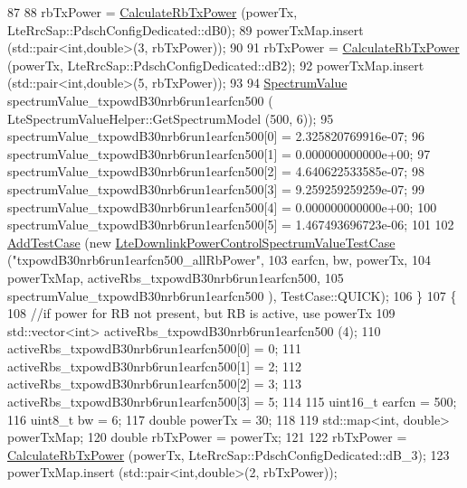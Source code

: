 \begin{DoxyCode}
87 
88     rbTxPower = \hyperlink{classLteDownlinkPowerControlTestSuite_acbda226a1db61d5328141d80aca96447}{CalculateRbTxPower} (powerTx, LteRrcSap::PdschConfigDedicated::dB0);
89     powerTxMap.insert (std::pair<int,double>(3, rbTxPower));
90 
91     rbTxPower = \hyperlink{classLteDownlinkPowerControlTestSuite_acbda226a1db61d5328141d80aca96447}{CalculateRbTxPower} (powerTx, LteRrcSap::PdschConfigDedicated::dB2);
92     powerTxMap.insert (std::pair<int,double>(5, rbTxPower));
93 
94     \hyperlink{classns3_1_1SpectrumValue}{SpectrumValue} spectrumValue\_txpowdB30nrb6run1earfcn500 (
      LteSpectrumValueHelper::GetSpectrumModel (500, 6));
95     spectrumValue\_txpowdB30nrb6run1earfcn500[0] = 2.325820769916e-07;
96     spectrumValue\_txpowdB30nrb6run1earfcn500[1] = 0.000000000000e+00;
97     spectrumValue\_txpowdB30nrb6run1earfcn500[2] = 4.640622533585e-07;
98     spectrumValue\_txpowdB30nrb6run1earfcn500[3] = 9.259259259259e-07;
99     spectrumValue\_txpowdB30nrb6run1earfcn500[4] = 0.000000000000e+00;
100     spectrumValue\_txpowdB30nrb6run1earfcn500[5] = 1.467493696723e-06;
101 
102     \hyperlink{classns3_1_1TestCase_a3718088e3eefd5d6454569d2e0ddd835}{AddTestCase} (\textcolor{keyword}{new} \hyperlink{classLteDownlinkPowerControlSpectrumValueTestCase}{LteDownlinkPowerControlSpectrumValueTestCase}
       (\textcolor{stringliteral}{"txpowdB30nrb6run1earfcn500\_allRbPower"},
103                                                                    earfcn, bw, powerTx,
104                                                                    powerTxMap, 
      activeRbs\_txpowdB30nrb6run1earfcn500,
105                                                                    spectrumValue\_txpowdB30nrb6run1earfcn500
      ), TestCase::QUICK);
106   \}
107   \{
108     \textcolor{comment}{//if power for RB not present, but RB is active, use powerTx}
109     std::vector<int> activeRbs\_txpowdB30nrb6run1earfcn500 (4);
110     activeRbs\_txpowdB30nrb6run1earfcn500[0] = 0;
111     activeRbs\_txpowdB30nrb6run1earfcn500[1] = 2;
112     activeRbs\_txpowdB30nrb6run1earfcn500[2] = 3;
113     activeRbs\_txpowdB30nrb6run1earfcn500[3] = 5;
114 
115     uint16\_t earfcn = 500;
116     uint8\_t bw = 6;
117     \textcolor{keywordtype}{double} powerTx = 30;
118 
119     std::map<int, double> powerTxMap;
120     \textcolor{keywordtype}{double} rbTxPower = powerTx;
121 
122     rbTxPower = \hyperlink{classLteDownlinkPowerControlTestSuite_acbda226a1db61d5328141d80aca96447}{CalculateRbTxPower} (powerTx, LteRrcSap::PdschConfigDedicated::dB\_3);
123     powerTxMap.insert (std::pair<int,double>(2, rbTxPower));

\end{DoxyCode}
